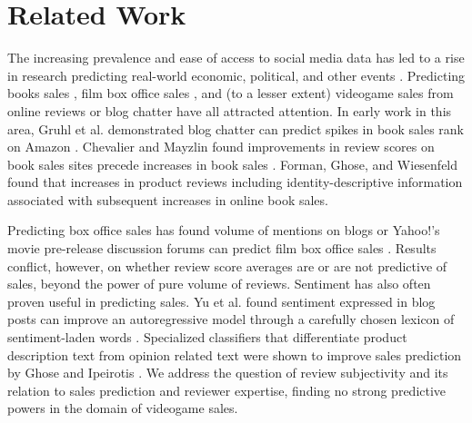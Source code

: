 \documentclass[letterpaper]{article}
\begin{document}
\section{Related Work}
The increasing prevalence and ease of access to social media data has led to a rise in research predicting real-world economic, political, and other events \cite{asur2010predicting}. Predicting books sales \cite{gruhl2005predictive,chevalier2003effect}, film box office sales \cite{dellarocas2007exploring,yu2012mining}, and (to a lesser extent) videogame sales \cite{ehrenfeld2011predicting,marcoux2009hybrid} from online reviews or blog chatter have all attracted attention. In early work in this area, Gruhl et al. demonstrated blog chatter can predict spikes in book sales rank on Amazon \cite{gruhl2005predictive}. Chevalier and Mayzlin found improvements in review scores on book sales sites precede increases in book sales \cite{chevalier2003effect}. Forman, Ghose, and Wiesenfeld found that increases in product reviews including identity-descriptive information associated with subsequent increases in online book sales.

Predicting box office sales has found volume of mentions on blogs or Yahoo!'s movie pre-release discussion forums can predict film box office sales \cite{liu2001word,duan2008online}. Results conflict, however, on whether review score averages are \cite{dellarocas2007exploring} or are not \cite{liu2001word,duan2008online} predictive of sales, beyond the power of pure volume of reviews.
Sentiment has also often proven useful in predicting sales. Yu et al. found sentiment expressed in blog posts can improve an autoregressive model through a carefully chosen lexicon of sentiment-laden words \cite{yu2012mining}. Specialized classifiers that differentiate product description text from opinion related text were shown to improve sales prediction by Ghose and Ipeirotis \cite{ghose2007designing}. 
We address the question of review subjectivity and its relation to sales prediction and reviewer expertise, finding no strong predictive powers in the domain of videogame sales.
\end{document}
